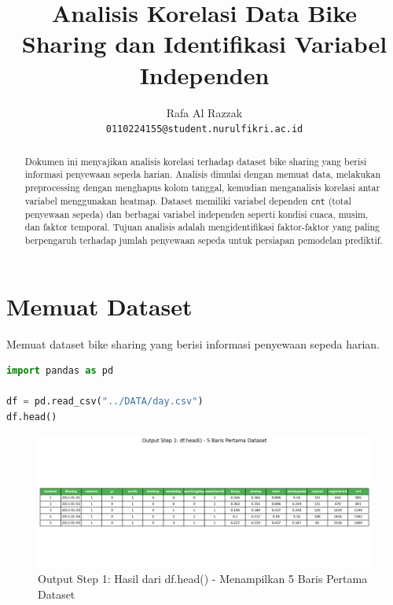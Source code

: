\documentclass[11pt,a4paper]{article}
\title{\textbf{Analisis Korelasi Data Bike Sharing dan Identifikasi Variabel Independen}}
\author{Rafa Al Razzak \\ \texttt{0110224155@student.nurulfikri.ac.id}}
\begin{document}
    \maketitle
    \onehalfspacing

    \begin{abstract}
        Dokumen ini menyajikan analisis korelasi terhadap dataset bike sharing yang berisi informasi penyewaan sepeda harian.
        \hspace{1cm}Analisis dimulai dengan memuat data, melakukan preprocessing dengan menghapus kolom tanggal, kemudian menganalisis korelasi antar variabel menggunakan heatmap.
        \hspace{1cm}Dataset memiliki variabel dependen \texttt{cnt} (total penyewaan sepeda) dan berbagai variabel independen seperti kondisi cuaca, musim, dan faktor temporal.
        \hspace{1cm}Tujuan analisis adalah mengidentifikasi faktor-faktor yang paling berpengaruh terhadap jumlah penyewaan sepeda untuk persiapan pemodelan prediktif.
    \end{abstract}

    \vspace{-1mm}


    \section{Memuat Dataset}
    Memuat dataset bike sharing yang berisi informasi penyewaan sepeda harian.
    \begin{lstlisting}[language=Python]
import pandas as pd

df = pd.read_csv("../DATA/day.csv")
df.head()
    \end{lstlisting}

    \begin{figure}[h]
        \centering
        \includegraphics[width=1.0\textwidth]{./OUTPUT/step1_data_head.png}
        \caption{Output Step 1: Hasil dari df.head() - Menampilkan 5 Baris Pertama Dataset}
        \label{fig:data_head}
    \end{figure}
\end{document}
